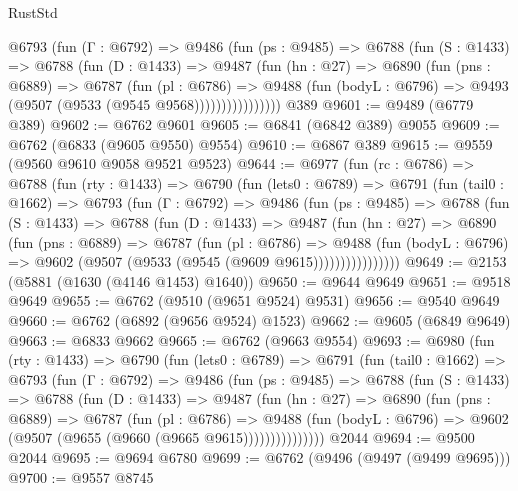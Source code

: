 \begin{lexlean}{RustStd}
\begin{coremodule}
            @6793
              (fun (Γ : @6792) =>
              @9486
                (fun (ps : @9485) =>
                @6788
                  (fun (S : @1433) =>
                  @6788
                    (fun (D : @1433) =>
                    @9487
                      (fun (hn : @27) =>
                      @6890
                        (fun (pns : @6889) =>
                        @6787
                          (fun (pl : @6786) =>
                          @9488
                            (fun (bodyL : @6796) => @9493 (@9507 (@9533 (@9545 @9568))))))))))))))))
    @389
@9601 := @9489 (@6779 @389)
@9602 := @6762 @9601
@9605 := @6841 (@6842 @389) @9055
@9609 := @6762 (@6833 (@9605 @9550) @9554)
@9610 := @6867 @389
@9615 := @9559 (@9560 @9610 @9058 @9521 @9523)
@9644 := @6977
    (fun (rc : @6786) =>
    @6788
      (fun (rty : @1433) =>
      @6790
        (fun (lets0 : @6789) =>
        @6791
          (fun (tail0 : @1662) =>
          @6793
            (fun (Γ : @6792) =>
            @9486
              (fun (ps : @9485) =>
              @6788
                (fun (S : @1433) =>
                @6788
                  (fun (D : @1433) =>
                  @9487
                    (fun (hn : @27) =>
                    @6890
                      (fun (pns : @6889) =>
                      @6787
                        (fun (pl : @6786) =>
                        @9488
                          (fun (bodyL : @6796) =>
                          @9602 (@9507 (@9533 (@9545 (@9609 @9615))))))))))))))))
@9649 := @2153 (@5881 (@1630 (@4146 @1453) @1640))
@9650 := @9644 @9649
@9651 := @9518 @9649
@9655 := @6762 (@9510 (@9651 @9524) @9531)
@9656 := @9540 @9649
@9660 := @6762 (@6892 (@9656 @9524) @1523)
@9662 := @9605 (@6849 @9649)
@9663 := @6833 @9662
@9665 := @6762 (@9663 @9554)
@9693 := @6980
    (fun (rty : @1433) =>
    @6790
      (fun (lets0 : @6789) =>
      @6791
        (fun (tail0 : @1662) =>
        @6793
          (fun (Γ : @6792) =>
          @9486
            (fun (ps : @9485) =>
            @6788
              (fun (S : @1433) =>
              @6788
                (fun (D : @1433) =>
                @9487
                  (fun (hn : @27) =>
                  @6890
                    (fun (pns : @6889) =>
                    @6787
                      (fun (pl : @6786) =>
                      @9488
                        (fun (bodyL : @6796) =>
                        @9602 (@9507 (@9655 (@9660 (@9665 @9615)))))))))))))))
    @2044
@9694 := @9500 @2044
@9695 := @9694 @6780
@9699 := @6762 (@9496 (@9497 (@9499 @9695)))
@9700 := @9557 @8745

\end{coremodule}
\end{lexlean}
